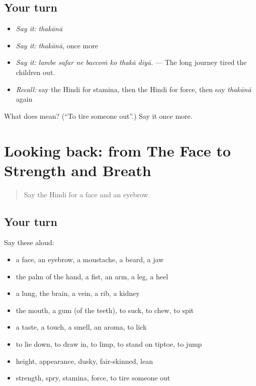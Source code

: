 \subsection*{Your turn}
\begin{itemize}
\raggedright
  \item \emph{Say it:} \emph{thakānā}
  \item \emph{Say it:} \emph{thakānā}, once more
  \item \emph{Say it:} \emph{lambe safar ne baccoṁ ko thakā diyā.} — The long journey tired the children out.
  \item \emph{Recall:} say the Hindi for stamina, then the Hindi for force, then say \emph{thakānā} again
\end{itemize}

\begin{tcolorbox}[breakable,colback=teal!4,colframe=teal!35!black,title={Before you move on}]
What does  mean? (\textquotedblleft{}To tire someone out\textquotedblright{}.) Say it once more.
\end{tcolorbox}
\section[(dialogue)]{Looking back: from The Face to Strength and Breath}

\label{lesson:HI-R483-review-476-483}



\begin{quote}
Say the Hindi for a face and an eyebrow.
\end{quote}

\subsection*{Your turn}
Say these aloud:

\begin{itemize}
\raggedright
  \item a face, an eyebrow, a moustache, a beard, a jaw
  \item the palm of the hand, a fist, an arm, a leg, a heel
  \item a lung, the brain, a vein, a rib, a kidney
  \item the mouth, a gum (of the teeth), to suck, to chew, to spit
  \item a taste, a touch, a smell, an aroma, to lick
  \item to lie down, to draw in, to limp, to stand on tiptoe, to jump
  \item height, appearance, dusky, fair-skinned, lean
  \item strength, spry, stamina, force, to tire someone out
\end{itemize}

